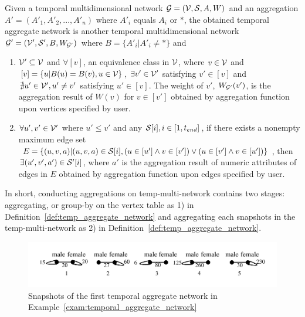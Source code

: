 \documentclass[10pt,journal,compsoc]{IEEEtran}
\begin{document}
\begin{definition}
	\label{def:temp_aggregate_network}
	Given a temporal multidimensional network $\mathcal{G}=(\mathcal{V},\mathcal{S},A,W)$ and an aggregation $A'=(A'_1,A'_2,...,A'_n)$ where $A'_i$ equals $A_i$ or $\ast$, the obtained temporal aggregate network is another temporal multidimensional network $\mathcal{G}'=(\mathcal{V}',\mathcal{S}',B,W_{\mathcal{G}'})$ where $B=\{A'_i|A'_i \neq \ast\}$ and
	\begin{enumerate}
		\item $\mathcal{V}' \subseteq \mathcal{V}$ and $\forall [v]$, an equivalence class in $\mathcal{V}$, where $ v \in \mathcal{V} $ and $[v]=\{u|B(u)=B(v),u \in \mathcal{V}\}$, $\exists v' \in \mathcal{V}'$ satisfying $v' \in [v]$ and $\nexists u' \in \mathcal{V}', u' \neq v'$ satisfying $u' \in [v]$. The weight of $v'$, $W_{\mathcal{G}'}(v')$, is the aggregation result of $W(v)$ for $v \in [v']$ obtained by aggregation function upon vertices specified by user.
		\item $\forall u',v' \in \mathcal{V}'$ where $u' \leq v'$ and any $\mathcal{S}[i], i \in [1,t_{end}]$, if there exists a nonempty maximum edge set $E=\{(u,v,a)|(u,v,a) \in \mathcal{S}[i],(u \in [u'] \wedge v \in [v']) \vee (u \in [v'] \wedge v \in [u']) \}$, then $ \exists (u',v',a') \in \mathcal{S}'[i] $, where $a'$ is the aggregation result of numeric attributes of edges in $E$ obtained by aggregation function upon edges specified by user.
	\end{enumerate}
\end{definition}
In short, conducting aggregations on temp-multi-network contains two stages: aggregating, or group-by on the vertex table as 1) in Definition~\ref{def:temp_aggregate_network} and aggregating each snapshots in the temp-multi-network as 2) in Definition~\ref{def:temp_aggregate_network}.

\begin{figure}[t!]
	\begin{center}
		\includegraphics[width=0.95\columnwidth]{fig/example/exam_aggregate_gender.pdf}
	\end{center}
	\vspace*{-0.9cm}
	\caption{Snapshots of the first temporal aggregate network in Example~\ref{exam:temporal_aggregate_network}}
	\vspace*{-0.4cm}
	\label{fig:aggregation_gender}
\end{figure}
\end{document}
